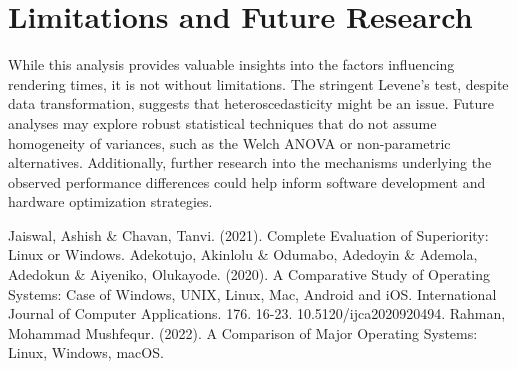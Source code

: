 \documentclass[conference]{IEEEtran}
\begin{document}
\section{Limitations and Future Research}

While this analysis provides valuable insights into the factors influencing rendering times, it is not without limitations. The stringent Levene's test, despite data transformation, suggests that heteroscedasticity might be an issue. Future analyses may explore robust statistical techniques that do not assume homogeneity of variances, such as the Welch ANOVA or non-parametric alternatives. Additionally, further research into the mechanisms underlying the observed performance differences could help inform software development and hardware optimization strategies.

\begin{thebibliography}{00}
 Jaiswal, Ashish \& Chavan, Tanvi. (2021). Complete Evaluation of Superiority: Linux or Windows. 
 Adekotujo, Akinlolu \& Odumabo, Adedoyin \& Ademola, Adedokun \& Aiyeniko, Olukayode. (2020). A Comparative Study of Operating Systems: Case of Windows, UNIX, Linux, Mac, Android and iOS. International Journal of Computer Applications. 176. 16-23. 10.5120/ijca2020920494. 
 Rahman, Mohammad Mushfequr. (2022). A Comparison of Major Operating Systems: Linux, Windows, macOS. 
\end{thebibliography}
\end{document}
